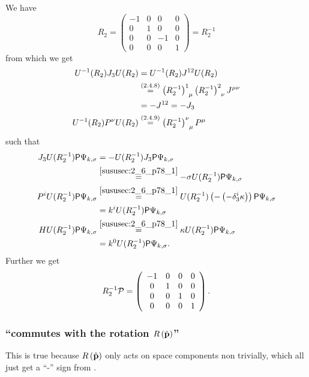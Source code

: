 \subsubsection{ }
We have \[R_2 = \left(
\begin{array}{cccc}
	-1 & 0 & 0 & 0 \\
	0 & 1 & 0 & 0 \\
	0 & 0 & -1 & 0 \\
	0 & 0 & 0 & 1
\end{array}
\right)=R_2^{-1}\]
from which we get
\begin{align*} 
	U^{-1}(R_2)J_3U(R_2)&=U^{-1}(R_2)J^{12}U(R_2)\\
	&\overset{({2.4.8})}{=}\left(R_2^{-1}\right)^1_{\hphantom{1}\mu}\left(R_2^{-1}\right)^2_{\hphantom{2}\nu} J^{\mu\nu}\\
	&=- J^{12}=-J_3\\
	U^{-1}(R_2)P^\nu U(R_2)&\overset{({2.4.9})}{=}\left(R_2^{-1}\right)^\nu_{\hphantom{\nu}\mu}P^\mu
\end{align*}
such that
\begin{align*} 
	J_3 U(R_2^{-1}) \mathsf{P} \Psi_{k,\sigma}&= -U(R_2^{-1})J_3 \mathsf{P} \Psi_{k,\sigma}\\
	&\overset{\ref{sususec:2_6_p78_1}}{=}-\sigma U(R_2^{-1})\mathsf{P} \Psi_{k,\sigma}\\
	P^i U(R_2^{-1}) \mathsf{P} \Psi_{k,\sigma}&\overset{\ref{sususec:2_6_p78_1}}{=}U(R_2^{-1}) \left(-\left(-\delta^i_3\kappa\right)\right) \mathsf{P} \Psi_{k,\sigma}\\
	&=k^iU(R_2^{-1}) \mathsf{P} \Psi_{k,\sigma}\\
	H U(R_2^{-1}) \mathsf{P} \Psi_{k,\sigma}&\overset{\ref{sususec:2_6_p78_1}}{=} \kappa U(R_2^{-1}) \mathsf{P} \Psi_{k,\sigma}\\
	&=k^0U(R_2^{-1}) \mathsf{P} \Psi_{k,\sigma}.
\end{align*}
Further we get
\[R_2^{-1}\mathcal{\mathcal{P}}=\left(
\begin{array}{cccc}
	-1 & 0 & 0 & 0 \\
	0 & 1 & 0 & 0 \\
	0 & 0 & 1 & 0 \\
	0 & 0 & 0 & 1
\end{array}
\right).\]

\subsubsection{\enquote{\paritymatrix commutes with the rotation $R\left(\hat{\mathbf{p}}\right)$} }
This is true because $R\left(\hat{\mathbf{p}}\right)$ only acts on space components non trivially, which all just get a \enquote{-} sign from \paritymatrix.

